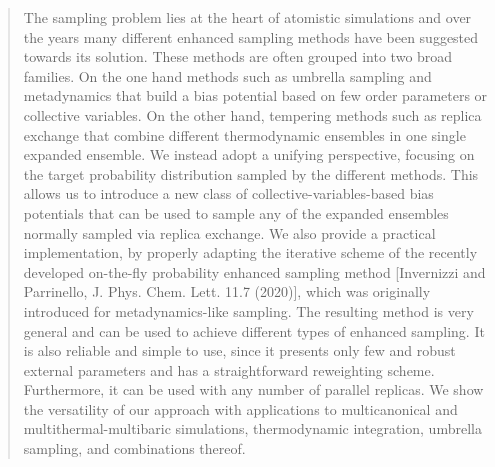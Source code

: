 \documentclass[aps,prx,reprint,superscriptaddress]{revtex4-1} %
\begin{document}
\date{\today}

\begin{abstract}
The sampling problem lies at the heart of atomistic simulations and over the years many different enhanced sampling methods have been suggested towards its solution.
These methods are often grouped into two broad families.
On the one hand methods such as umbrella sampling and metadynamics that build a bias potential based on few order parameters or collective variables.
On the other hand, tempering methods such as replica exchange that combine different thermodynamic ensembles in one single expanded ensemble.
We instead adopt a unifying perspective, focusing on the target probability distribution sampled by the different methods.
This allows us to introduce a new class of collective-variables-based bias potentials that can be used to sample any of the expanded ensembles normally sampled via replica exchange.
We also provide a practical implementation, by properly adapting the iterative scheme of the recently developed on-the-fly probability enhanced sampling method [Invernizzi and Parrinello, J. Phys. Chem. Lett. 11.7 (2020)], which was originally introduced for metadynamics-like sampling.
The resulting method is very general and can be used to achieve different types of enhanced sampling.
It is also reliable and simple to use, since it presents only few and robust external parameters and has a straightforward reweighting scheme.
Furthermore, it can be used with any number of parallel replicas.
We show the versatility of our approach with applications to multicanonical and multithermal-multibaric simulations, thermodynamic integration, umbrella sampling, and combinations thereof.
\end{abstract}


\maketitle
\end{document}
